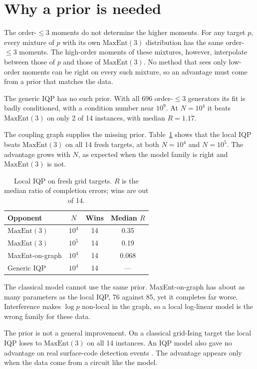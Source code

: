 \documentclass[aps,pra,twocolumn,superscriptaddress,nofootinbib]{revtex4-2}
\newcommand{\ME}{\mathrm{MaxEnt}(3)}
\begin{document}
\section{Why a prior is needed}

The order-$\le3$ moments do not determine the higher moments.
For any target $p$, every mixture of $p$ with its own $\ME$ distribution has the same order-$\le3$ moments.
The high-order moments of these mixtures, however, interpolate between those of $p$ and those of $\ME$.
No method that sees only low-order moments can be right on every such mixture, so an advantage must come from a
prior that matches the data.

The generic IQP has no such prior.
With all 696 order-$\le3$ generators its fit is badly conditioned, with a condition number near $10^9$.
At $N=10^4$ it beats $\ME$ on only 2 of 14 instances, with median $R=1.17$.

The coupling graph supplies the missing prior.
Table~\ref{tab:step23} shows that the local IQP beats $\ME$ on all 14 fresh targets, at both $N=10^4$ and $N=10^5$.
The advantage grows with $N$, as expected when the model family is right and $\ME$ is not.

\begin{table}[t]
\caption{Local IQP on fresh grid targets. $R$ is the median ratio of completion errors; wins are out of 14.}
\label{tab:step23}
\begin{ruledtabular}
\begin{tabular}{lccc}
Opponent & $N$ & Wins & Median $R$ \\
\hline
$\ME$ & $10^4$ & 14 & 0.35 \\
$\ME$ & $10^5$ & 14 & 0.19 \\
MaxEnt-on-graph & $10^4$ & 14 & 0.068 \\
Generic IQP & $10^4$ & 14 & --- \\
\end{tabular}
\end{ruledtabular}
\end{table}

The classical model cannot use the same prior.
MaxEnt-on-graph has about as many parameters as the local IQP, 76 against 85, yet it completes far worse.
Interference makes $\log p$ non-local in the graph, so a local log-linear model is the wrong family for these data.

The prior is not a general improvement.
On a classical grid-Ising target the local IQP loses to $\ME$ on all 14 instances.
An IQP model also gave no advantage on real surface-code detection events \cite{google2023suppressing}.
The advantage appears only when the data come from a circuit like the model.
\end{document}
